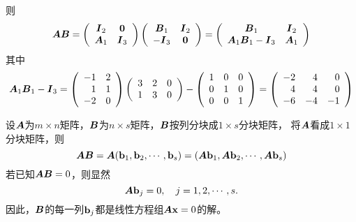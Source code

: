 \begin{frame}\ft{\secname}
则
$$
\boldsymbol{A}\boldsymbol{B} = \left(
  \begin{array}{cc}
    \boldsymbol{I}_2 & \boldsymbol{0}\\
    \boldsymbol{A}_1 & \boldsymbol{I}_3
  \end{array}
\right)\left(
  \begin{array}{cc}
    \boldsymbol{B}_1 & \boldsymbol{I}_2\\
    -\boldsymbol{I}_3 & \boldsymbol{0}
  \end{array}
\right) = \left(
  \begin{array}{cc}
    \boldsymbol{B}_1 & \boldsymbol{I}_2\\
    \boldsymbol{A}_1\boldsymbol{B}_1-\boldsymbol{I}_3 & \boldsymbol{A}_1
  \end{array}
\right)
$$
其中
$$
\boldsymbol{A}_1\boldsymbol{B}_1-\boldsymbol{I}_3 = \left(
  \begin{array}{rr}
    -1&2\\
    1&1\\
    -2&0
  \end{array}
\right)\left(
  \begin{array}{rrr}
    3&2&0\\
    1&3&0
  \end{array}
\right)-\left(
  \begin{array}{ccc}
    1&0&0\\
    0&1&0\\
    0&0&1
  \end{array}
\right)=\left(
  \begin{array}{rrr}
    -2&4&0\\
    4&4&0\\
    -6&-4&-1
  \end{array}
\right)
$$
\end{frame}

\begin{frame}\ft{\secname}

\begin{li}
  设$\boldsymbol{A}$为$m\times n$矩阵，$\boldsymbol{B}$为$n\times s$矩阵，$\boldsymbol{B}$按列分块成$1\times s$分块矩阵，
  将$\boldsymbol{A}$看成$1\times 1$分块矩阵，则
  $$
  \boldsymbol{A}\boldsymbol{B}=\boldsymbol{A}(\mathbf{b}_1,\mathbf{b}_2,\cdots,\mathbf{b}_s)=(\boldsymbol{A}\mathbf{b}_1,\boldsymbol{A}\mathbf{b}_2,\cdots,\boldsymbol{A}\mathbf{b}_s)      
  $$
  若已知$\boldsymbol{A}\boldsymbol{B}=0$，则显然
  $$
  \boldsymbol{A}\mathbf{b}_j=0, \quad j=1,2,\cdots,s.
  $$
  因此，$\boldsymbol{B}$的每一列$\mathbf{b}_j$都是线性方程组$\boldsymbol{A}\mathbf{x}=0$的解。
\end{li}    
\end{frame}

